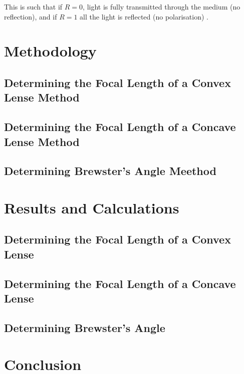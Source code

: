\documentclass[12pt]{article}
\begin{document}
\vspace{.5cm}

This is such that if $R=0$, light is fully transmitted through the medium (no reflection), and if $R=1$ all the light is reflected (no polarisation)
\cite{UCDlens}.

\section{Methodology} 

\subsection{Determining the Focal Length of a Convex Lense Method}



\subsection{Determining the Focal Length of a Concave Lense Method}



\subsection{Determining Brewster's Angle Meethod}



\section{Results and Calculations}

\subsection{Determining the Focal Length of a Convex Lense}



\subsection{Determining the Focal Length of a Concave Lense}



\subsection{Determining Brewster's Angle}



\section{Conclusion} \label{sec:4}
\end{document}
